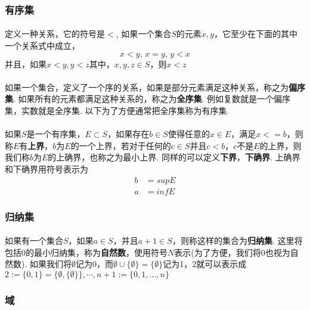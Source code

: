 \subsubsection{有序集}
\paragraph{}
定义一种关系，它的符号是$<$, 如果一个集合$S$的元素$x, y$，它至少在下面的其中一个关系式中成立，
$$ 
x < y, \, x = y, \,  y < x
$$
并且，如果$x < y, y < z$其中，$x,y,z \in S$，则$x < z$

\paragraph{}
如果一个集合，定义了一个序的关系，如果是部分元素满足这种关系，称之为\textbf{偏序集}. 如果所有的元素都满足这种关系的，称之为\textbf{全序集}. 例如复数就是一个偏序集，实数就是全序集. 以下为了方便通常把全序集称为有序集.

\paragraph{}
如果$S$是一个有序集，$E \subset S$，如果存在$b \in S$使得任意的$x \in E$，满足$x <= b$，则称$E$有\textbf{上界}，$b$为$E$的一个上界，若对于任何的$c \in S$并且$c < b$，$c$不是$E$的上界，则我们称$b$为$E$的上确界，也称之为最小上界. 同样的可以定义\textbf{下界}，\textbf{下确界}. 上确界和下确界用符号表示为
\begin{align*}
b &= supE  \\
a &= infE  
\end{align*}



\subsubsection{归纳集}
\paragraph{}
 如果有一个集合$S$，如果$a \in S$，并且$a + 1 \in S$，则称这样的集合为\textbf{归纳集}.  这里将包括$0$的最小归纳集，称为\textbf{自然数}，使用符号$N$表示(为了方便，我们将0也视为自然数).  如果我们将$\emptyset$记为0，而$\emptyset \cup \{\emptyset\} = \{\emptyset\}$记为1，2就可以表示成$ 2 := \{0, 1\} = \{\emptyset, \{\emptyset\}\}, \cdots, n + 1 := \{0, 1, \dotsc, n\}$


\subsubsection{域}
